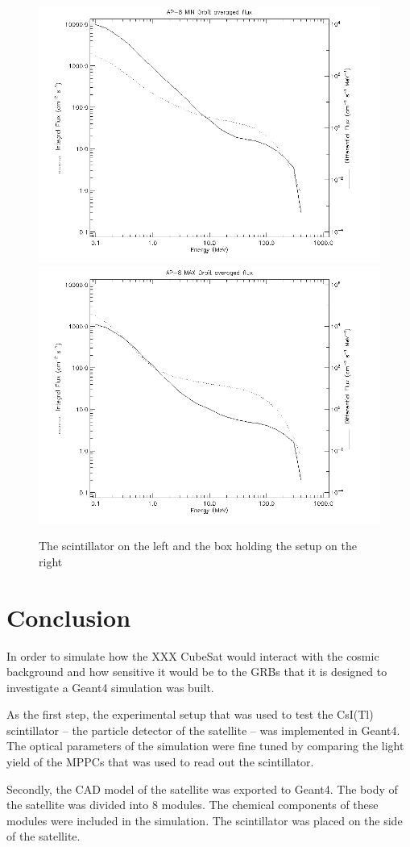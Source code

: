 \documentclass[12pt, a4paper,titlepage]{article}
\numberwithin{equation}{section}
\numberwithin{figure}{section}
\begin{document}
\begin{figure}[htbp]
 \centering %
 \includegraphics[width=.45\textwidth,origin=c,angle=0]{images/alt_600km_AP-8_MIN_averaged_spectra.png}
 \qquad
 \includegraphics[width=.45\textwidth,origin=c]{images/alt_600km_AP-8_MAX_averaged_spectra.png} 
 \caption{\label{fig:i} The scintillator on the left and the box holding the setup on the right}
 \end{figure}


\pagebreak
\section{Conclusion}

In order to simulate how the XXX CubeSat would interact with the cosmic background and how sensitive it would be to the GRBs that it is designed to investigate a Geant4 simulation was built.

As the first step, the experimental setup that was used to test the CsI(Tl) scintillator -- the particle detector of the satellite -- was implemented in Geant4. The optical parameters of the simulation were fine tuned by comparing the light yield of the MPPCs that was used to read out the scintillator.

Secondly, the CAD model of the satellite was exported to Geant4. The body of the satellite was divided into 8 modules. The chemical components of these modules were included in the simulation. The scintillator was placed on the side of the satellite.
\end{document}

